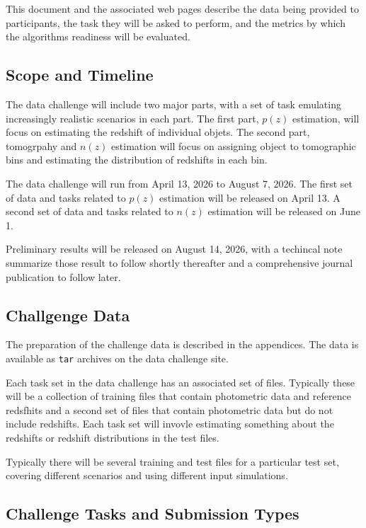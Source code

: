 \documentclass[modern]{desc-tex/styles/lsstdescnote}
\begin{document}
This document and the associated web pages describe the data being
provided to participants, the task they will be asked to perform, and
the metrics by which the algorithms readiness will be evaluated.


\subsection{Scope and Timeline}

The data challenge will include two major parts, with a set of
task emulating increasingly realistic scenarios in each part.   The
first part, $p(z)$ estimation, will focus on estimating the redshift of
individual objets.   The second part, tomogrpahy and $n(z)$ estimation
will focus on assigning object to tomographic bins and estimating the
distribution of redshifts in each bin.

The data challenge will run from April 13, 2026 to August 7, 2026.
The first set of data and tasks related to $p(z)$ estimation will be
released on April 13.  A second set of data and tasks related to
$n(z)$ estimation will be released on June 1.

Preliminary results will be released on August 14, 2026, with a
techincal note summarize those result to follow shortly thereafter and
a comprehensive journal publication to follow later.


\subsection{Challgenge Data}

The preparation of the challenge data is described in the appendices.
The data is available as \texttt{tar} archives on the data challenge site.

Each task set in the data challenge has an associated set of files.
Typically these will be a collection of training files that contain
photometric data and reference redsfhits and a second set of files
that contain photometric data but do not include redshifts.   Each
task set will invovle estimating something about the redshifts or
redshift distributions in the test files.

Typically there will be several training and test files for a
particular test set, covering different scenarios and using different
input simulations.


\subsection{Challenge Tasks and Submission Types}
\end{document}
